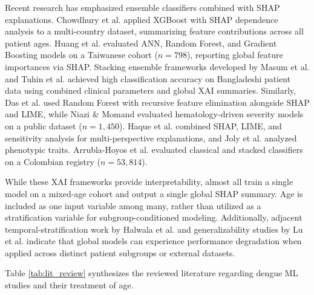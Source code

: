 \documentclass[conference]{IEEEtran}
\begin{document}
Recent research has emphasized ensemble classifiers combined with SHAP explanations. Chowdhury et al. \cite{chowdhury2022} applied XGBoost with SHAP dependence analysis to a multi-country dataset, summarizing feature contributions across all patient ages. Huang et al. \cite{huang2020} evaluated ANN, Random Forest, and Gradient Boosting models on a Taiwanese cohort ($n=798$), reporting global feature importances via SHAP. Stacking ensemble frameworks developed by Masum et al. \cite{masum2025} and Tuhin et al. \cite{tuhin2025} achieved high classification accuracy on Bangladeshi patient data using combined clinical parameters and global XAI summaries. Similarly, Das et al. \cite{das2025} used Random Forest with recursive feature elimination alongside SHAP and LIME, while Niazi \& Momand \cite{niazi2026} evaluated hematology-driven severity models on a public dataset ($n=1,450$). Haque et al. \cite{haque2025} combined SHAP, LIME, and sensitivity analysis for multi-perspective explanations, and Joly et al. \cite{joly2024} analyzed phenotypic traits. Arrubla-Hoyos et al. \cite{arrubla2023} evaluated classical and stacked classifiers on a Colombian registry ($n=53,814$).

While these XAI frameworks provide interpretability, almost all train a single model on a mixed-age cohort and output a single global SHAP summary. Age is included as one input variable among many, rather than utilized as a stratification variable for subgroup-conditioned modeling. Additionally, adjacent temporal-stratification work by Halwala et al. \cite{halwala2025} and generalizability studies by Lu et al. \cite{lu2025} indicate that global models can experience performance degradation when applied across distinct patient subgroups or external datasets.

Table \ref{tab:lit_review} synthesizes the reviewed literature regarding dengue ML studies and their treatment of age.
\end{document}
